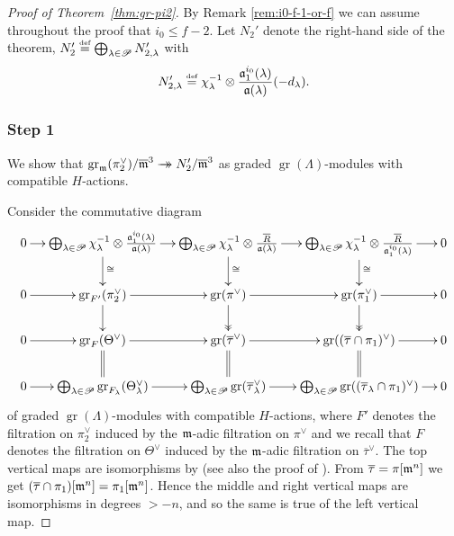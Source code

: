 \documentclass[JEP,XML,SOM,Unicode,NoFloatCountersInSection, NoEqCountersInSection,published]{cedram}
\newcommand{\onto}{\mathchoice{\to\hspace*{-5mm}\to}{\mathrel{\hbox{$\to\hspace*{-2.85mm}\to$}}}{\to\hspace*{-3mm}\to}{\to\hspace*{-3mm}\to}}
\let\ovl\overline
\newcommand{\defeq}{\stackrel{\textrm{\tiny{\upshape{def}}}}{=}}
\renewcommand{\P}{\mathscr P}
\DeclareMathOperator{\gr}{gr}
\theoremstyle{plain}
\theoremstyle{definition}
\begin{document}
\begin{proof}[Proof of Theorem~\ref{thm:gr-pi2}]
By Remark \ref{rem:i0-f-1-or-f} we can assume throughout the proof that $i_0\leq f-2$. Let $N_2'$ denote the right-hand side of the theorem, \ie $N_2' \defeq \bigoplus_{\lambda \in \P} N_{2,\lambda}'$ with
\[
N_{2,\lambda}' \defeq \chi_\lambda^{-1} \otimes \frac{\mathfrak{a}_1^{i_0}(\lambda)}{\mathfrak{a}(\lambda)}(-d_\lambda).
\]

\subsubsection*{Step 1}
We show that $\gr_\m(\pi_2^\vee)/ \ovl\m^3 \onto N_2'/\ovl\m^3$ as graded $\gr(\Lambda)$-modules with compatible $H$-actions.

Consider the commutative diagram
\begin{equation*}
\xymatrix@C=.4cm@R=.7cm{
0 \ar[r] & \bigoplus_{\lambda \in \P} \chi_\lambda^{-1} \otimes \frac{\mathfrak{a}_1^{i_0}(\lambda)}{\mathfrak{a}(\lambda)} \ar[r]\ar^{\cong}[d] & \bigoplus_{\lambda \in \P} \chi_\lambda^{-1} \otimes \frac{\ovl R}{\mathfrak{a}(\lambda)} \ar[r]\ar^{\cong}[d] & \bigoplus_{\lambda \in \P} \chi_\lambda^{-1} \otimes \frac{\ovl R}{\mathfrak{a}_1^{i_0}(\lambda)} \ar[r]\ar^{\cong}[d] & 0 \\
0 \ar[r] & \gr_{F'}(\pi_2^\vee) \ar[r]\ar[d] & \gr(\pi^\vee) \ar[r]\ar@{->>}[d] & \gr(\pi_1^\vee) \ar[r]\ar@{->>}[d] & 0 \\
0 \ar[r] & \gr_F(\Theta^\vee) \ar[r]\ar@{=}[d] & \gr(\ovl\tau^\vee) \ar[r]\ar@{=}[d] & \gr((\ovl\tau\cap \pi_1)^\vee) \ar[r]\ar@{=}[d] & 0 \\
0 \ar[r] & \bigoplus_{\lambda \in \P} \gr_{F_\lambda}(\Theta_\lambda^\vee) \ar[r] & \bigoplus_{\lambda \in \P} \gr(\ovl\tau_\lambda^\vee) \ar[r] & \bigoplus_{\lambda \in \P} \gr((\ovl\tau_\lambda \cap \pi_1)^\vee) \ar[r] & 0
}
\end{equation*}
of graded $\gr(\Lambda)$-modules with compatible $H$-actions, where $F'$ denotes the filtration on $\pi_2^\vee$ induced by the $\mathfrak{m}$-adic filtration on $\pi^\vee$ and we recall that $F$ denotes the filtration on $\Theta^\vee$ induced by the $\mathfrak{m}$-adic filtration on $\ovl\tau^\vee$.
The top vertical maps are isomorphisms by \cite[Cor.\,4.4.5]{BHHMS4} (see also the proof of \cite[Prop.\,4.4.3]{BHHMS4}).
From $\ovl\tau = \pi[\m^{n}]$ we get $(\ovl\tau\cap \pi_1)[\m^{n}] = \pi_1[\m^{n}]$.
Hence the middle and right vertical maps are isomorphisms in degrees $> -n$,
and so the same is true of the left vertical map.

\end{proof}
\end{document}
